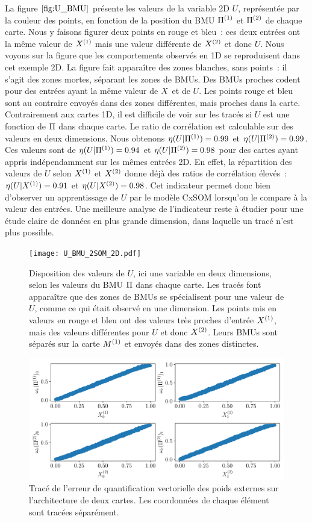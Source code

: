 \documentclass[../main]{subfiles}
\begin{document}
La figure $\ref{fig:U_BMU}$ présente les valeurs de la variable 2D $U$, représentée par la couleur des points, en fonction de la position du BMU $\Pi^{({1})}$ et $\Pi^{({2})}$ de chaque carte. Nous y faisons figurer deux points en rouge et bleu~: ces deux entrées ont la même valeur de $X^{({1})}$ mais une valeur différente de $X^{({2})}$ et donc $U$.
Nous voyons sur la figure que les comportements observés en 1D se reproduisent dans cet exemple 2D. La figure fait apparaître des zones blanches, sans points~: il s'agit des zones mortes, séparant les zones de BMUs. Des BMUs proches codent pour des entrées ayant la même valeur de $X$ et de $U$. Les points rouge et bleu sont au contraire envoyés dans des zones différentes, mais proches dans la carte.
Contrairement aux cartes 1D, il est difficile de voir sur les tracés si $U$ est une fonction de $\Pi$ dans chaque carte. Le ratio de corrélation est calculable sur des valeurs en deux dimensions.
Nous obtenons $\eta(U|\Pi^{({1})}) = 0.99 $ et $\eta(U|\Pi^{({2})}) = 0.99 $.
Ces valeurs sont de $\eta(U|\Pi^{({1})}) = 0.94 $ et $\eta(U|\Pi^{({2})}) = 0.98$ pour des cartes ayant appris indépendamment sur les mêmes entrées 2D.
En effet, la répartition des valeurs de $U$ selon $X^{({1})}$ et $X^{({2})}$ donne déjà des ratios de corrélation élevés~:
$\eta(U|X^{({1})}) = 0.91$ et $\eta(U|X^{({2})}) = 0.98$. 
Cet indicateur permet donc bien d'observer un apprentissage de $U$ par le modèle CxSOM lorsqu'on le compare à la valeur des entrées. Une meilleure analyse de l'indicateur reste à étudier pour une étude claire de données en plus grande dimension, dans laquelle un tracé n'est plus possible.

\begin{figure}
	\texttt{[image: U\_BMU\_2SOM\_2D.pdf]}
	\caption{Disposition des valeurs de $U$, ici une variable en deux dimensions, selon les valeurs du BMU $\Pi$ dans chaque carte. Les tracés font apparaître que des zones de BMUs se spécialisent pour une valeur de $U$, comme ce qui était observé en une dimension. Les points mis en valeurs en rouge et bleu ont des valeurs très proches d'entrée $X^{({1})}$, mais des valeurs différentes pour $U$ et donc $X^{({2})}$. Leurs BMUs sont séparés sur la carte $M^{({1})}$ et envoyés dans des zones distinctes.
	\label{fig:U_BMU}}
\end{figure}

\begin{figure}
	\includegraphics[width=\textwidth]{error-2SOM.pdf}
	\caption{Tracé de l'erreur de quantification vectorielle des poids externes sur l'architecture de deux cartes. Les coordonnées de chaque élément sont tracées séparément. \label{fig:qv2D}}
\end{figure}
\end{document}
